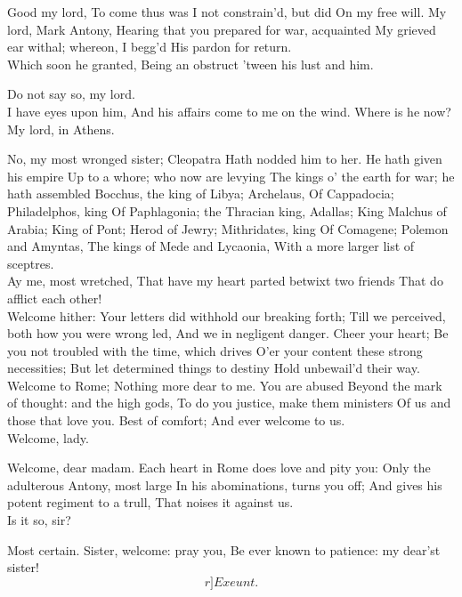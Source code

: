 \documentclass{book}
\begin{document}
	Good my lord,
	To come thus was I not constrain'd, but did
	On my free will. My lord, Mark Antony,
	Hearing that you prepared for war, acquainted
	My grieved ear withal; whereon, I begg'd
	His pardon for return. \\

\3	Which soon he granted,
	Being an obstruct 'tween his lust and him.

	Do not say so, my lord.  \\

\3	I have eyes upon him,
	And his affairs come to me on the wind.
	Where is he now? \\

	                  My lord, in Athens.

\3	No, my most wronged sister; Cleopatra
	Hath nodded him to her. He hath given his empire
	Up to a whore; who now are levying
	The kings o' the earth for war; he hath assembled
	Bocchus, the king of Libya; Archelaus,
	Of Cappadocia; Philadelphos, king
	Of Paphlagonia; the Thracian king, Adallas;
	King Malchus of Arabia; King of Pont;
	Herod of Jewry; Mithridates, king
	Of Comagene; Polemon and Amyntas,
	The kings of Mede and Lycaonia,
	With a more larger list of sceptres. \\

	Ay me, most wretched,
	That have my heart parted betwixt two friends
	That do afflict each other! \\

\3	Welcome hither:
	Your letters did withhold our breaking forth;
	Till we perceived, both how you were wrong led,
	And we in negligent danger. Cheer your heart;
	Be you not troubled with the time, which drives
	O'er your content these strong necessities;
	But let determined things to destiny
	Hold unbewail'd their way. Welcome to Rome;
	Nothing more dear to me. You are abused
	Beyond the mark of thought: and the high gods,
	To do you justice, make them ministers
	Of us and those that love you. Best of comfort;
	And ever welcome to us. \\

\4	Welcome, lady.

	Welcome, dear madam.
	Each heart in Rome does love and pity you:
	Only the adulterous Antony, most large
	In his abominations, turns you off;
	And gives his potent regiment to a trull,
	That noises it against us. \\

	Is it so, sir?

\3	Most certain. Sister, welcome: pray you,
	Be ever known to patience: my dear'st sister! \[r]Exeunt.\]
\end{document}
